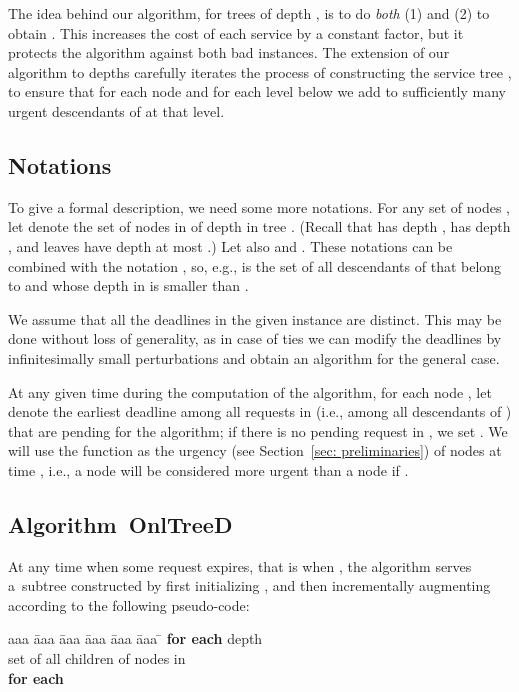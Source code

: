 \documentclass[a4paper]{article}
\newcommand{\OnAlgTreesDeadlines}{{\sc OnlTreeD}}
\begin{document}
The idea behind our algorithm, for trees of depth , is to do 
\emph{both} (1) and (2) to obtain . This increases the cost of each
service by a constant factor, but it protects the algorithm against
both bad instances. The extension of our algorithm to depths 
 carefully iterates the
process of constructing the service tree , to ensure that for each
node  and for each level  below  we add to 
sufficiently many urgent descendants of  at that level.


\subsection{Notations}

To give a formal description, we need some more notations.
For any set of nodes , let  denote the set of
nodes in  of depth  in tree . (Recall
that  has depth ,  has depth , and leaves have depth at
most .) Let also  and . These notations can be combined with the notation
, so, e.g.,  is the set of all descendants of  that
belong to  and whose depth in  is smaller than .

We assume that all the deadlines in the given instance are
distinct. This may be done without loss of generality, as in case of
ties we can modify the deadlines by infinitesimally small
perturbations and obtain an algorithm for the general case. 

At any given time  during the computation of the algorithm, for
each node , let  denote the earliest deadline among all
requests in  (i.e., among all descendants of ) that are
pending for the algorithm; if there is no pending request in
, we set .  We will use the function  as
the urgency (see Section~\ref{sec: preliminaries})
of nodes at time , i.e., a node  will be
considered more urgent than a node  if .


\subsection{Algorithm~{\OnAlgTreesDeadlines}}

At any time  when some request expires, that is when  , the
algorithm serves a~subtree  constructed by first initializing
, and then incrementally augmenting 
according to the following pseudo-code:

\begin{tabbing}
aaa \= aaa \= aaa \= aaa \= aaa \= aaa \= \kill
\> \textbf{for each} depth \\
\> \>  set of all children of nodes in  \\
\> \> \textbf{for each}  \\
\> \> \>  \\
\> \> \> 
\end{tabbing}
\end{document}
